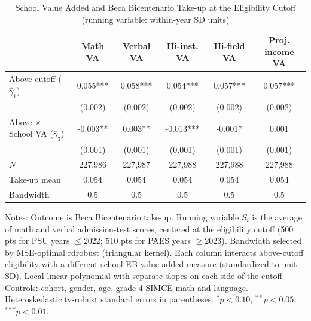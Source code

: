 \begin{table}[!htbp]
\centering
\caption{School Value Added and Beca Bicentenario Take-up at the Eligibility Cutoff (running variable: within-year SD units)}
\label{tab:bicentenario-rd-va-interaction-sd}
\begin{tabular}{lccccc}
\toprule
 & Math VA & Verbal VA & Hi-inst. VA & Hi-field VA & Proj. income VA \\
\midrule
Above cutoff ($\hat{\gamma}_1$) & 0.055*** & 0.058*** & 0.054*** & 0.057*** & 0.057*** \\
        & (0.002) & (0.002) & (0.002) & (0.002) & (0.002) \\
Above $\times$ School VA ($\hat{\gamma}_3$) & -0.003** & 0.003** & -0.013*** & -0.001* & 0.001 \\
        & (0.001) & (0.001) & (0.001) & (0.001) & (0.001) \\
\midrule
$N$ & 227,986 & 227,987 & 227,988 & 227,988 & 227,988 \\
Take-up mean & 0.054 & 0.054 & 0.054 & 0.054 & 0.054 \\
Bandwidth & 0.5 & 0.5 & 0.5 & 0.5 & 0.5 \\
\bottomrule
\end{tabular}
\par\medskip\footnotesize
\begin{minipage}{\textwidth}
Notes: Outcome is Beca Bicentenario take-up. Running variable $S_i$ is the average of math and verbal admission-test scores, centered at the eligibility cutoff (500 pts for PSU years $\leq$2022; 510 pts for PAES years $\geq$2023). Bandwidth selected by MSE-optimal rdrobust (triangular kernel). Each column interacts above-cutoff eligibility with a different school EB value-added measure (standardized to unit SD). Local linear polynomial with separate slopes on each side of the cutoff. Controls: cohort, gender, age, grade-4 SIMCE math and language. Heteroskedasticity-robust standard errors in parentheses. $^{*}p<0.10$, $^{**}p<0.05$, $^{***}p<0.01$.
\end{minipage}
\end{table}
